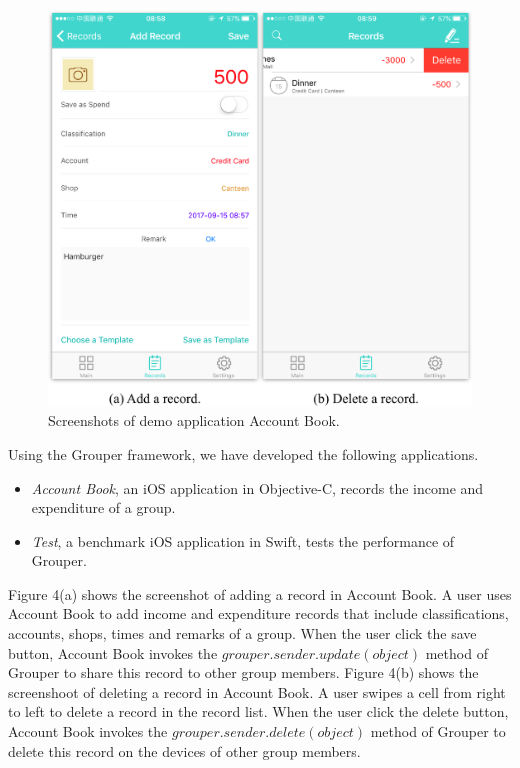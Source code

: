 \documentclass[twocolumn,10pt]{article}
\begin{document}
\begin{figure}[t]
	\centering
	\includegraphics[scale=0.5]{account_book}
	\caption{Screenshots of demo application Account Book.}
\end{figure}

Using the Grouper framework, we have developed the following applications. 

\begin{itemize}
	\setlength{\itemsep}{1pt}
	\setlength{\parskip}{0pt}
	\setlength{\parsep}{0pt}
	\item \emph{Account Book}, an iOS application in Objective-C, records the income and expenditure of a group.
	\item \emph{Test}, a benchmark iOS application in Swift, tests the performance of Grouper.
\end{itemize}

Figure 4(a) shows the screenshot of adding a record in Account Book. 
A user uses Account Book to add income and expenditure records that include classifications, accounts, shops, times and remarks of a group. 
When the user click the save button, Account Book invokes the $grouper.sender.update(object)$ method of Grouper to share this record to other group members.
Figure 4(b) shows the screenshoot of deleting a record in Account Book. 
A user swipes a cell from right to left to delete a record in the record list. 
When the user click the delete button, Account Book invokes the $grouper.sender.delete(object)$ method of Grouper to delete this record on the devices of other group members.
\end{document}
